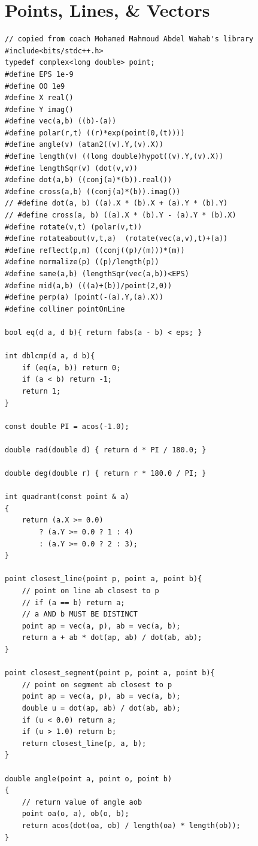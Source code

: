 \documentclass[12pt]{book}
\begin{document}
\section{Points, Lines, \& Vectors}
\begin{verbatim}
// copied from coach Mohamed Mahmoud Abdel Wahab's library
#include<bits/stdc++.h>
typedef complex<long double> point;
#define EPS 1e-9
#define OO 1e9
#define X real()
#define Y imag()
#define vec(a,b) ((b)-(a))
#define polar(r,t) ((r)*exp(point(0,(t))))
#define angle(v) (atan2((v).Y,(v).X))
#define length(v) ((long double)hypot((v).Y,(v).X))
#define lengthSqr(v) (dot(v,v))
#define dot(a,b) ((conj(a)*(b)).real())
#define cross(a,b) ((conj(a)*(b)).imag())
// #define dot(a, b) ((a).X * (b).X + (a).Y * (b).Y)
// #define cross(a, b) ((a).X * (b).Y - (a).Y * (b).X)
#define rotate(v,t) (polar(v,t))
#define rotateabout(v,t,a)  (rotate(vec(a,v),t)+(a))
#define reflect(p,m) ((conj((p)/(m)))*(m))
#define normalize(p) ((p)/length(p))
#define same(a,b) (lengthSqr(vec(a,b))<EPS)
#define mid(a,b) (((a)+(b))/point(2,0))
#define perp(a) (point(-(a).Y,(a).X))
#define colliner pointOnLine

bool eq(d a, d b){ return fabs(a - b) < eps; }

int dblcmp(d a, d b){
	if (eq(a, b)) return 0;
	if (a < b) return -1;
	return 1;
}

const double PI = acos(-1.0);

double rad(double d) { return d * PI / 180.0; }

double deg(double r) { return r * 180.0 / PI; }

int quadrant(const point & a)
{
	return (a.X >= 0.0)
		? (a.Y >= 0.0 ? 1 : 4)
		: (a.Y >= 0.0 ? 2 : 3);
}

point closest_line(point p, point a, point b){
	// point on line ab closest to p
	// if (a == b) return a;
	// a AND b MUST BE DISTINCT
	point ap = vec(a, p), ab = vec(a, b);
	return a + ab * dot(ap, ab) / dot(ab, ab);
}

point closest_segment(point p, point a, point b){
	// point on segment ab closest to p
	point ap = vec(a, p), ab = vec(a, b);
	double u = dot(ap, ab) / dot(ab, ab);
	if (u < 0.0) return a;
	if (u > 1.0) return b;
	return closest_line(p, a, b);
}

double angle(point a, point o, point b)
{
	// return value of angle aob
	point oa(o, a), ob(o, b);
	return acos(dot(oa, ob) / length(oa) * length(ob));
}


\end{verbatim}
\end{document}

